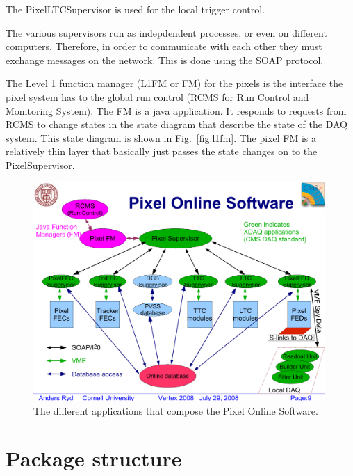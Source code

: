 The PixelLTCSupervisor is used for the local trigger control.

The various supervisors run as indepdendent processes, or even on
different computers. Therefore, in order to communicate with each
other they must exchange messages on the network. This is done using
the SOAP protocol.

The Level 1 function manager (L1FM or FM) for the pixels is the
interface the pixel system has to the global run control (RCMS for
Run Control and Monitoring System). The FM is a java application.
It responds to requests from RCMS to change states in the 
state diagram that describe the state of the DAQ system. This
state diagram is shown in Fig.~\ref{fig:l1fm}.  The pixel
FM is a relatively thin layer that basically just passes the state
changes on to the PixelSupervisor. 

\begin{figure}
\begin{center}
 \includegraphics[width=0.99\textwidth]{POScomponents.pdf}
\end{center}
\caption{The different applications that compose the Pixel Online Software.}
\label{fig:components}
\end{figure}

\section{Package structure} \label{sect:swcomponets}

